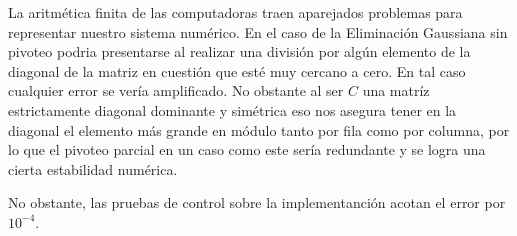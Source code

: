 La aritmética finita de las computadoras traen aparejados problemas para representar nuestro sistema numérico. En el caso de la Eliminación Gaussiana sin pivoteo podria presentarse al realizar una división por algún elemento de la diagonal de la matriz en cuestión que esté muy cercano a cero. En tal caso cualquier error se vería amplificado. No obstante al ser $C$ una matríz estrictamente diagonal dominante y simétrica eso nos asegura tener en la diagonal el elemento más grande en módulo tanto por fila como por columna, por lo que el pivoteo parcial en un caso como este sería redundante y se logra una cierta estabilidad numérica.

No obstante, las pruebas de control sobre la implementanción acotan el error por $10^{-4}$.
